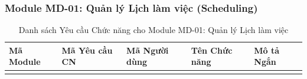 \subsubsection{Module MD-01: Quản lý Lịch làm việc (Scheduling)}


\begin{longtable}{|m{2cm}|m{2.5cm}|m{2cm}|m{4cm}|m{4.5cm}|}
\caption{Danh sách Yêu cầu Chức năng cho Module MD-01: Quản lý Lịch làm việc} \label{tab:fr_md01} \\
\hline
\textbf{Mã Module} & \textbf{Mã Yêu cầu CN} & \textbf{Mã Người dùng} & \textbf{Tên Chức năng} & \textbf{Mô tả Ngắn} \\
\hline
\endhead %

\hline
\endfoot %

\hline
\endlastfoot %


\end{longtable}
